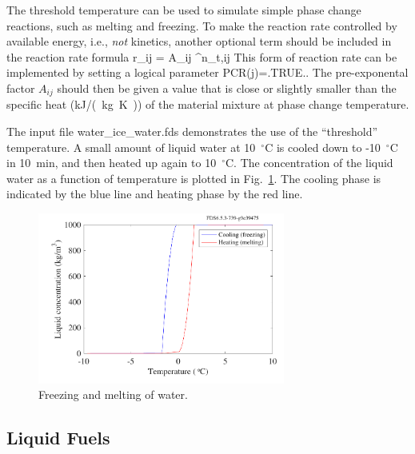 \documentclass[11pt]{book}
\begin{document}
The threshold temperature can be used to simulate simple phase change reactions, such as melting and freezing. To make the reaction rate controlled by available energy, i.e., {\em not} kinetics, another optional term should be included in the reaction rate formula
\be
  r_{ij} = A_{ij} \max{}^{n_{{\rm t},ij}}
  \label{rr3}
\ee
This form of reaction rate can be implemented by setting a logical parameter {\ct PCR(j)=.TRUE.}. The pre-exponental factor $A_{ij}$ should then be given a value that is close or slightly smaller than the specific heat (\si{kJ/(kg.K)}) of the material mixture at phase change temperature.

The input file {\ct water\_ice\_water.fds} demonstrates the use of the ``threshold'' temperature. A small amount of liquid water at 10~$^\circ$C is cooled down to -10~$^\circ$C in 10~min, and then heated up again to 10~$^\circ$C. The concentration of the liquid water as a function of temperature is plotted in Fig.~\ref{water_ice_water_plot}. The cooling phase is indicated by the blue line and heating phase by the red line.

\begin{figure}[ht]
\begin{center}
\includegraphics[width=3.2in]{SCRIPT_FIGURES/water_ice_water}
\end{center}
\caption[Results of the {\ct water\_ice\_water} test case]{Freezing and melting of water.}
\label{water_ice_water_plot}
\end{figure}




\subsection{Liquid Fuels}
\label{info:liquid_fuels}
\end{document}
